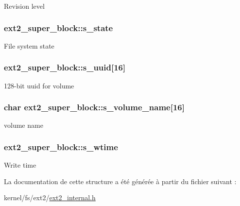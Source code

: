 Revision level \hypertarget{structext2__super__block_a06b739ed98ef97510f193cb582e78eb6}{
\subsubsection[{s\+\_\+state}]{ ext2\+\_\+super\+\_\+block\+::s\+\_\+state}}\label{structext2__super__block_a06b739ed98ef97510f193cb582e78eb6}
File system state \hypertarget{structext2__super__block_a1a546d295c2dc760ece8bf44c7623eb3}{
\subsubsection[{s\+\_\+uuid}]{ ext2\+\_\+super\+\_\+block\+::s\+\_\+uuid\mbox{[}16\mbox{]}}}\label{structext2__super__block_a1a546d295c2dc760ece8bf44c7623eb3}
128-\/bit uuid for volume \hypertarget{structext2__super__block_aafa5ddd1cf9fbf19aa2b80e83bff5a43}{
\subsubsection[{s\+\_\+volume\+\_\+name}]{\setlength{\rightskip}{0pt plus 5cm}char ext2\+\_\+super\+\_\+block\+::s\+\_\+volume\+\_\+name\mbox{[}16\mbox{]}}}\label{structext2__super__block_aafa5ddd1cf9fbf19aa2b80e83bff5a43}
volume name \hypertarget{structext2__super__block_a97c255a8e87dbea1ab953b0a8fce054d}{
\subsubsection[{s\+\_\+wtime}]{ ext2\+\_\+super\+\_\+block\+::s\+\_\+wtime}}\label{structext2__super__block_a97c255a8e87dbea1ab953b0a8fce054d}
Write time 

La documentation de cette structure a été générée à partir du fichier suivant \+:\begin{DoxyCompactItemize}
\item 
kernel/fs/ext2/\hyperlink{ext2__internal_8h}{ext2\+\_\+internal.\+h}\end{DoxyCompactItemize}
